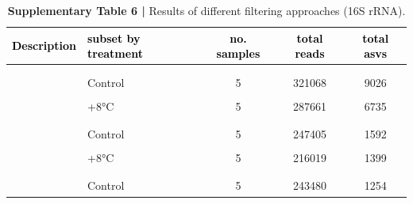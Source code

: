 \documentclass[
  10pt,
  letterpaper,
  DIV=11,
  numbers=noendperiod]{scrartcl}
\begin{document}
\begin{table}[H]

\caption{\textbf{Supplementary Table 6 |} Results of different filtering approaches (16S rRNA).}
\centering
\fontsize{8}{10}\selectfont
\begin{tabular}[t]{llccc}
\toprule
\textcolor{black}{\textbf{Description}} & \textcolor{black}{\textbf{subset by treatment}} & \textcolor{black}{\textbf{no. samples}} & \textcolor{black}{\textbf{total reads}} & \textcolor{black}{\textbf{total asvs}}\\
\midrule
\addlinespace[-0.3em]
\multicolumn{5}{l}{\textbf{}}\\
\hspace{1em}\cellcolor{gray!6}{FULL data set} & \cellcolor{gray!6}{} & \cellcolor{gray!6}{15} & \cellcolor{gray!6}{936640} & \cellcolor{gray!6}{20173}\\
\hspace{1em} & Control & 5 & 321068 & 9026\\
\hspace{1em}\cellcolor{gray!6}{} & \cellcolor{gray!6}{+3°C} & \cellcolor{gray!6}{5} & \cellcolor{gray!6}{327911} & \cellcolor{gray!6}{8154}\\
\hspace{1em} & +8°C & 5 & 287661 & 6735\\
\addlinespace[-0.3em]
\multicolumn{5}{l}{\textbf{}}\\
\hspace{1em}\cellcolor{gray!6}{Arbitrary filter} & \cellcolor{gray!6}{} & \cellcolor{gray!6}{15} & \cellcolor{gray!6}{729973} & \cellcolor{gray!6}{1822}\\
\hspace{1em} & Control & 5 & 247405 & 1592\\
\hspace{1em}\cellcolor{gray!6}{} & \cellcolor{gray!6}{+3°C} & \cellcolor{gray!6}{5} & \cellcolor{gray!6}{266549} & \cellcolor{gray!6}{1682}\\
\hspace{1em} & +8°C & 5 & 216019 & 1399\\
\addlinespace[-0.3em]
\multicolumn{5}{l}{\textbf{}}\\
\hspace{1em}\cellcolor{gray!6}{PERFect filter} & \cellcolor{gray!6}{} & \cellcolor{gray!6}{15} & \cellcolor{gray!6}{731508} & \cellcolor{gray!6}{1659}\\
\hspace{1em} & Control & 5 & 243480 & 1254\\

\end{tabular}
\end{table}
\end{document}
